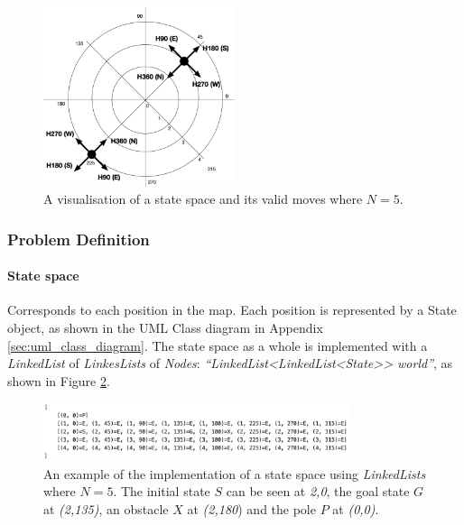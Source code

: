 \documentclass[letterpaper,12pt]{article}
\begin{document}
\begin{figure}[ht]
\centering
\includegraphics[width=0.5\textwidth]{report/figures/map.png}
\caption{\label{fig:map}A visualisation of a state space and its valid moves where $N=5$.}
\end{figure}


\subsubsection{Problem Definition}
\label{sec:problem_definition}

\paragraph{State space} Corresponds to each position in the map. Each position is represented by a State object, as shown in the UML Class diagram in Appendix \ref{sec:uml_class_diagram}. The state space as a whole is implemented with a \textit{LinkedList} of \textit{LinkesLists} of \textit{Nodes}: \textit{``LinkedList<LinkedList<State>> world''}, as shown in Figure \ref{fig:state_space}.

\begin{figure}[ht]
\centering
\includegraphics[width=0.8\textwidth]{report/figures/world.png}
\caption{\label{fig:state_space}An example of the implementation of a state space using \textit{LinkedLists} where $N=5$. The initial state $S$ can be seen at \textit{2,0}, the goal state $G$ at \textit{(2,135)}, an obstacle $X$ at \textit{(2,180}) and the pole $P$ at \textit{(0,0)}.}
\end{figure}
\end{document}
